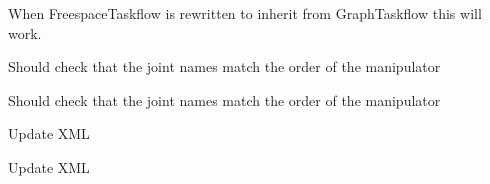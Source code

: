 
\begin{DoxyRefList}
\item[Member \mbox{\hyperlink{taskflow__profiling__example_8cpp_ae66f6b31b5ad750f1fe042a706a4e3d4}{main}} ()]\label{todo__todo000034}%
%
When Freespace\+Taskflow is rewritten to inherit from Graph\+Taskflow this will work.  
\item[Member \mbox{\hyperlink{namespacetesseract__planning_a5479a76ec33cda8924d0e54d336e5ccc}{tesseract\+\_\+planning\+::Default\+Descartes\+Problem\+Generator}} (const std\+::string \&name, const \mbox{\hyperlink{structtesseract__planning_1_1PlannerRequest}{Planner\+Request}} \&request, const Descartes\+Plan\+Profile\+Map$<$ Float\+Type $>$ \&plan\+\_\+profiles)]\label{todo__todo000008}%
%
Should check that the joint names match the order of the manipulator 

\label{todo__todo000007}%
%
Should check that the joint names match the order of the manipulator  
\item[Member \mbox{\hyperlink{classtesseract__planning_1_1DescartesDefaultPlanProfile_a8bbf9dd170dfc5da44f4117d74ca7a6a}{tesseract\+\_\+planning\+::Descartes\+Default\+Plan\+Profile$<$ Float\+Type $>$\+::Descartes\+Default\+Plan\+Profile}} (const tinyxml2\+::\+XMLElement \&xml\+\_\+element)]\label{todo__todo000005}%
%
Update XML 

\label{todo__todo000004}%
%
Update XML 


\end{DoxyRefList}
